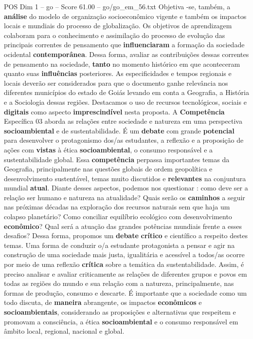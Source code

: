 \begin{textsample}{POS Dim 1 – go – Score 61.00 – go/go\_em\_56.txt}
Objetiva -se, também, a \textbf{análise} do modelo de organização socioeconômico vigente e também os impactos locais e mundiais do processo de globalização.
Os objetivos de aprendizagem colaboram para o conhecimento e assimilação do processo de evolução das principais correntes de pensamento que \textbf{influenciaram} a formação da sociedade ocidental \textbf{contemporânea}.
Dessa forma, avaliar as contribuições dessas correntes de pensamento na sociedade, \textbf{tanto} no momento histórico em que aconteceram quanto suas \textbf{influências} posteriores.
As especificidades e tempos regionais e locais deverão ser considerados para que o documento ganhe relevância nos diferentes municípios do estado de Goiás levando em conta a Geografia, a História e a Sociologia dessas regiões.
Destacamos o uso de recursos tecnológicos, sociais e \textbf{digitais} como aspecto \textbf{imprescindível} nesta proposta.
A \textbf{Competência} Específica 03 aborda as relações entre sociedade e natureza em uma perspectiva \textbf{socioambiental} e de sustentabilidade.
É um \textbf{debate} com grande \textbf{potencial} para desenvolver o protagonismo dos/as estudantes, a reflexão e a proposição de ações com \textbf{vistas} à ética \textbf{socioambiental}, o consumo responsável e a sustentabilidade global.
Essa \textbf{competência} perpassa importantes temas da Geografia, principalmente nas questões globais de ordem geopolítica e desenvolvimento sustentável, temas muito discutidos e \textbf{relevantes} na conjuntura mundial \textbf{atual}.
Diante desses aspectos, podemos nos questionar : como deve ser a relação ser humano e natureza na atualidade?
Quais serão os \textbf{caminhos} a seguir nas próximas décadas na exploração dos recursos naturais sem que haja um colapso planetário?
Como conciliar equilíbrio ecológico com desenvolvimento \textbf{econômico}?
Qual será a atuação das grandes potências mundiais frente a esses desafios?
Dessa forma, propomos um \textbf{debate} \textbf{crítico} e científico a respeito destes temas.
Uma forma de conduzir o/a estudante protagonista a pensar e agir na construção de uma sociedade mais justa, igualitária e acessível a todos/as ocorre por meio de uma reflexão \textbf{crítica} sobre a temática da sustentabilidade.
Assim, é preciso analisar e avaliar criticamente as relações de diferentes grupos e povos em todas as regiões do mundo e sua relação com a natureza, principalmente, nas formas de produção, consumo e descarte.
É importante que a sociedade como um todo discuta, de \textbf{maneira} abrangente, os impactos \textbf{econômicos} e \textbf{socioambientais}, considerando as proposições e alternativas que respeitem e promovam a consciência, a ética \textbf{socioambiental} e o consumo responsável em âmbito local, regional, nacional e global.

\end{textsample}
